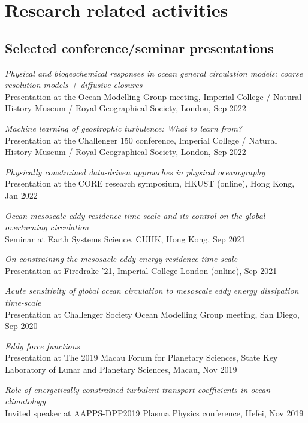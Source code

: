 \documentclass[letterpaper]{article}
\renewenvironment{itemize}{
  \begin{list}{}{
    \setlength{\leftmargin}{1.5em}
  }
}{
  \end{list}
}
\begin{document}
\section*{Research related activities}

\subsection*{Selected conference/seminar presentations}
\begin{itemize}

\item[--] \textit{Physical and biogeochemical responses in ocean general circulation models: coarse resolution models + diffusive closures}\\
Presentation at the Ocean Modelling Group meeting, Imperial College / Natural History Museum / Royal Geographical Society, London, Sep 2022

\item[--] \textit{Machine learning of geostrophic turbulence: What to learn from?}\\
Presentation at the Challenger 150 conference, Imperial College / Natural History Museum / Royal Geographical Society, London, Sep 2022

\item[--] \textit{Physically constrained data-driven approaches in physical oceanography}\\
Presentation at the CORE research symposium, HKUST (online), Hong Kong, Jan 2022

\item[--] \textit{Ocean mesoscale eddy residence time-scale and its control on the global overturning circulation}\\
Seminar at Earth Systems Science, CUHK, Hong Kong, Sep 2021

\item[--] \textit{On constraining the mesosacle eddy energy residence time-scale}\\
Presentation at Firedrake '21, Imperial College London (online), Sep 2021

\item[--] \textit{Acute sensitivity of global ocean circulation to mesoscale eddy energy dissipation time-scale}\\
Presentation at Challenger Society Ocean Modelling Group meeting, San Diego, Sep 2020

\item[--] \textit{Eddy force functions}\\
Presentation at The 2019 Macau Forum for Planetary Sciences, State Key
Laboratory of Lunar and Planetary Sciences, Macau, Nov 2019

\item[--] \textit{Role of energetically constrained turbulent transport
coefficients in ocean climatology}\\
Invited speaker at AAPPS-DPP2019 Plasma Physics conference, Hefei, Nov 2019

\end{itemize}
\end{document}
